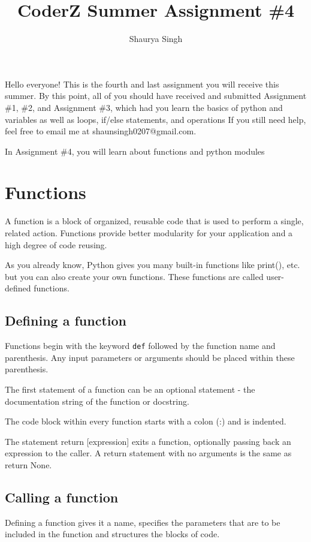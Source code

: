 \documentclass{scrartcl}
\author{Shaurya Singh}
\date{}
\title{CoderZ Summer Assignment \#4}
\begin{document}
\maketitle
\setcounter{tocdepth}{2}
\tableofcontents

Hello everyone! This is the fourth and last assignment you will receive this
summer. By this point, all of you should have received and submitted Assignment
\#1, \#2, and Assignment \#3, which had you learn the basics of python and
variables as well as loops, if/else statements, and operations If you still need help, feel free to email me at shaunsingh0207@gmail.com.

In Assignment \#4, you will learn about functions and python modules

\section{Functions}
\label{sec:org88f9c0f}
A function is a block of organized, reusable code that is used to perform a single, related action. Functions provide better modularity for your application and a high degree of code reusing.

As you already know, Python gives you many built-in functions like print(), etc. but you can also create your own functions. These functions are called user-defined functions.

\subsection{Defining a function}
\label{sec:orgff58c85}
Functions begin with the keyword \texttt{def} followed by the function name and
parenthesis. Any input parameters or arguments should be placed within these
parenthesis.

The first statement of a function can be an optional statement - the documentation string of the function or docstring.

The code block within every function starts with a colon (:) and is indented.

The statement return [expression] exits a function, optionally passing back an
expression to the caller. A return statement with no arguments is the same as
return None.

\subsection{Calling a function}
\label{sec:orga642b1e}
Defining a function gives it a name, specifies the parameters that are to be included in the function and structures the blocks of code.
\end{document}
